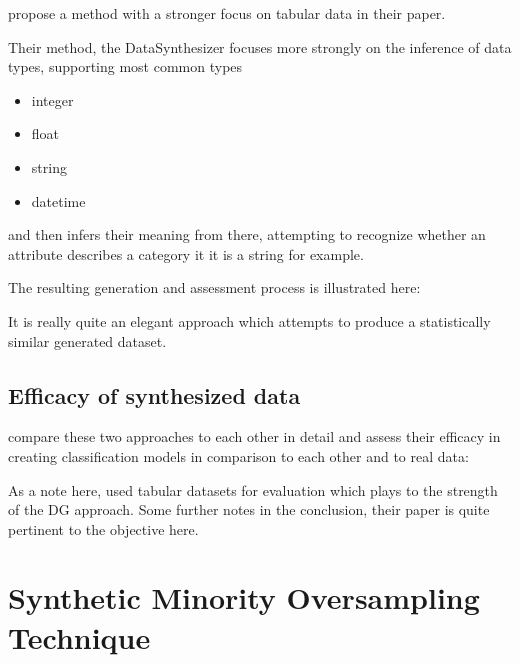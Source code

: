 \cite{ping2017datasynthesizer} propose a method with a stronger focus on tabular data in their paper.

Their method, the DataSynthesizer focuses more strongly on the inference of data types, supporting most common types

\begin{itemize}
	\item integer
	\item float
	\item string
	\item datetime
\end{itemize} 

and then infers their meaning from there, attempting to recognize whether an attribute describes a category it it is a string for example.

\pagebreak

The resulting generation and assessment process is illustrated here:


It is really quite an elegant approach which attempts to produce a statistically similar generated dataset.

\clearpage

\subsection{Efficacy of synthesized data}

\label{subsection:efficacy}

\cite{ares_utility} compare these two approaches to each other in detail and assess their efficacy in creating classification models in comparison to each other and to real data:


As a note here, \cite{ares_utility} used tabular datasets for evaluation which plays to the strength of the \ac{DG} approach. Some further notes in the conclusion, their paper is quite pertinent to the objective here.

\pagebreak

\section{Synthetic Minority Oversampling Technique}
\label{section:smote}

